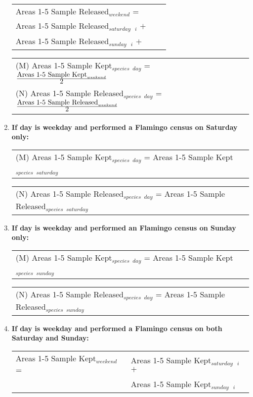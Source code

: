 \documentclass[letterpaper,12pt]{article}
\newcommand{\hspacer}{\hspace*{1cm}}
\newcommand{\fraction}[1]{\textrm{\normalsize{#1}}}
\begin{document}
\begin{enumerate}
\begin{tabular}{l@{ }l@{ }l}
\hspacer \hspacer	Areas 1-5 Sample Released$_{weekend}$ = \\
\hspacer \hspacer \hspacer Areas 1-5 Sample Released$_{saturday}$\ $_{i}$ $+$ \\
\hspacer \hspacer \hspacer Areas 1-5 Sample Released$_{sunday}$\ $_{i}$ $+$
\end{tabular}

\begin{tabular}{l@{ }l@{ }l}
	(M) Areas 1-5 Sample Kept$_{species}$ $_{day}$ =
		$
\frac
	{\fraction{Areas 1-5 Sample Kept}_{weekend}}
      	{\fraction{2}}
		$ \\

	(N) Areas 1-5 Sample Released$_{species}$ $_{day}$ =
		$
\frac
	{\fraction{Areas 1-5 Sample Released}_{weekend}}
      	{\fraction{2}}
		$
\end{tabular}

\item
\textbf{If day is weekday and performed a Flamingo census on Saturday only:} \\
\begin{tabular}{l@{ }}
	(M) Areas 1-5 Sample Kept$_{species}$ $_{day}$ =
		Areas 1-5 Sample Kept$_{species}$ $_{saturday}$
\end{tabular}

\begin{tabular}{l@{ }}
	(N) Areas 1-5 Sample Released$_{species}$ $_{day}$ =
		Areas 1-5 Sample Released$_{species}$ $_{saturday}$
\end{tabular}

\item
\textbf{If day is weekday and performed an Flamingo census on Sunday only:} \\
\begin{tabular}{l@{ }}
	(M) Areas 1-5 Sample Kept$_{species}$ $_{day}$ =
		Areas 1-5 Sample Kept$_{species}$ $_{sunday}$
\end{tabular}

\begin{tabular}{l@{ }}
	(N) Areas 1-5 Sample Released$_{species}$ $_{day}$ =
		Areas 1-5 Sample Released$_{species}$ $_{sunday}$
\end{tabular}

\item
\textbf{If day is weekday and performed a Flamingo census on both Saturday and Sunday:} \\
\begin{tabular}{l@{ }l@{ }}
	Areas 1-5 Sample Kept$_{weekend}$ =
	&  Areas 1-5 Sample Kept$_{saturday}$\ $_{i}$ $+$ \\
	& Areas 1-5 Sample Kept$_{sunday}$\ $_{i}$ \\


\end{tabular}
\end{enumerate}
\end{document}
